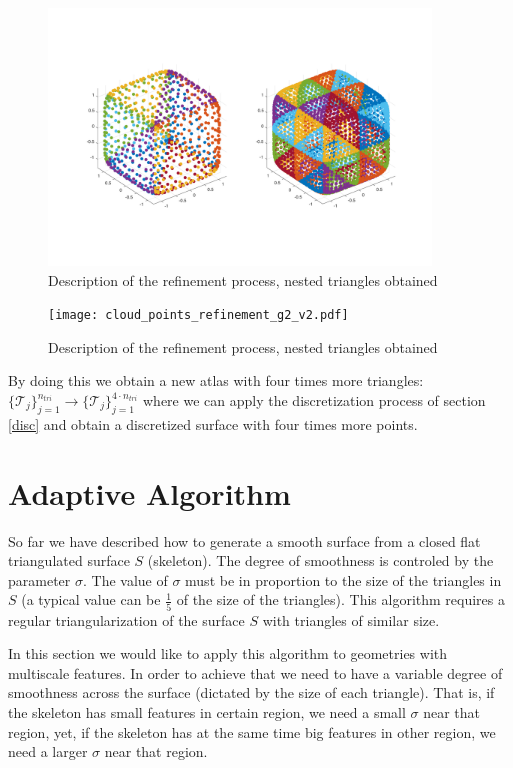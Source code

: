 \documentclass[11pt, oneside]{article}
\begin{document}
\begin{figure}[H]
\begin{center}
\includegraphics[width=4in]{cloud_points_refinement_v2.pdf}%
\end{center}
\caption{Description of the refinement process, nested triangles obtained}
\label{refinement2}
\end{figure}


\begin{figure}[H]
\begin{center}
\texttt{[image: cloud\_points\_refinement\_g2\_v2.pdf]}%
\end{center}
\caption{Description of the refinement process, nested triangles obtained}
\label{refinement3}
\end{figure}


By doing this we obtain a new atlas with four times more triangles: $\{\mathcal{T}_j\}_{j=1}^{n_{tri}}\rightarrow \{\mathcal{T}_j\}_{j=1}^{4\cdot n_{tri}}$ where we can apply the discretization process of section \ref{disc} and obtain a discretized surface with four times more points. 
 

\section{Adaptive Algorithm}

So far we have described how to generate a smooth surface from a closed flat triangulated surface $\mathit{S}$ (skeleton). The degree of smoothness is controled by the parameter $\sigma$. The value of $\sigma$ must be in proportion to the size of the triangles in $\mathit{S}$ (a typical value can be $\frac{1}{5}$ of the size of the triangles). This algorithm requires a regular triangularization of the surface $\mathit{S}$ with triangles of similar size.

In this section we would like to apply this algorithm to geometries with multiscale features. In order to achieve that we need to have a variable degree of smoothness across the surface (dictated by the size of each triangle). That is, if the skeleton has small features in certain region, we need a small $\sigma$ near that region, yet, if the skeleton has at the same time big features in other region, we need a larger $\sigma$ near that region.
\end{document}

